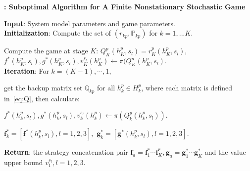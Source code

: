 \begin{algorithm}
\caption{\textbf{: Suboptimal Algorithm for A Finite Nonstationary  Stochastic Game }}
\textbf{Input}: System model parameters and game parameters.
\\\textbf{Initialization}:
             Compute the set of $(r_{kp}, \mathbb{P}_{kp})$ for $k=1,...K$.
              
             Compute the game at stage $K$: $Q_{K}^{p}(h^{p}_{K},s_{l})=r_{K}^{p}(h^{p}_{K},s_{l})$, \\ 
                    $f^{*}(h^{p}_{K}, s_{l}), g^{*}(h^{p}_{K}, s_{l}), v_{K}^{s_{l}}(h^{p}_{K}) \leftarrow \pi(Q_{K}^{p}(h^{p}_{K},s_{l}).$
\\\textbf{Iteration}: For $k=(K-1), \cdots, 1$,

get the backup matrix set $\mathbb{Q}_{kp}$ for all $h^{p}_{k}\in H^{p}_{k}$, where each matrix is defined in~\eqref{eq:Q}, then calculate:

 $f^{*}(h^{p}_{k}, s_{l}), g^{*}(h^{p}_{k}, s_{l}),v_{k}^{s_{l}}(h^{p}_{k}) \leftarrow \pi(Q_{k}^{p}(h^{p}_{k},s_{l}))$.
 

$\mathbf{f}^*_k=[\mathbf{f}^{*}(h^{p}_{k}, s_{l}),l=1,2,3],$ $ \mathbf{g}^{*}_k=[\mathbf{g}^*(h^{p}_{k}, s_{l}), l=1,2,3].$ 

\textbf{Return}: the strategy concatenation pair $\mathbf{f}_{a}=\mathbf{f}^{*}_1\cdots\mathbf{f}^*_K,\mathbf{g}_{a}=\mathbf{g}^{*}_1\cdots\mathbf{g}^*_K$ and the value upper bound $v^{s_{l}}_{1},l=1,2,3$.
\label{finite}
\end{algorithm}

